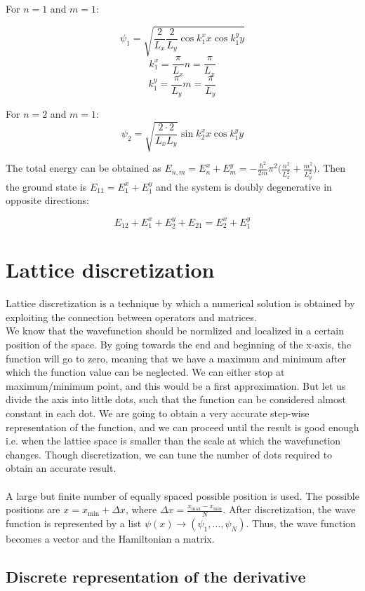   For $n=1$ and $m=1$:

  $$\psi_1 = \sqrt{\frac{2}{L_{x}}\frac{2}{L_{y}} \cos k_1^x x \cos k_1^y y}$$
  $$k_1^x = \frac{\pi}{L_{x}} n = \frac{\pi}{L_{x}}$$
  $$k_1^y = \frac{\pi}{L_{y}} m = \frac{\pi}{L_{y}}$$

  For $n=2$ and $m=1$:
  $$\psi_2 = \sqrt{\frac{2 \cdot 2}{L_{x}L_{y}}} \sin k_2^x x \cos k_1^y y$$

  The total energy can be obtained as $E_{n,m} = E_n^x+E_m^y = -\frac{\hbar^2}{2m}\pi^2\biggl(\frac{n^2}{L_x^2}+\frac{m^2}{L_y^2}\biggr)$.
  Then the ground state is $E_{11} = E_1^x+E_1^y$ and the system is doubly degenerative in opposite directions:

  $$E_{12} + E_1^x+E_2^y + E_{21} = E_2^x+E_1^y$$

\section{Lattice discretization}
Lattice discretization is a technique by which a numerical solution is obtained by exploiting the connection between operators and matrices.\\

\noindent
We know that the wavefunction should be normlized and localized in a certain position of the space.
By going towards the end and beginning of the x-axis, the function will go to zero, meaning that we have a maximum and minimum after which the function value can be neglected.
We can either stop at maximum/minimum point, and this would be a first approximation.
But let us divide the axis into little dots, such that the function can be considered almost constant in each dot.
We are going to obtain a very accurate step-wise representation of the function,  and we can proceed until the result is good enough i.e. when the lattice space is smaller than the scale at which the wavefunction changes.
Though discretization, we can tune the number of dots required to obtain an accurate result.\\
\\
\noindent
A large but finite number of equally spaced possible position is used.
The possible positions are $x = x_{\min} + \Delta x$, where $\Delta x = \frac{x_{\max}-x_{\min}}{N}$.
After discretization, the wave function is represented by a list $\psi(x) \rightarrow(\psi_1,\dots, \psi_N)$.
Thus, the wave function becomes a vector and the Hamiltonian a matrix.

  \subsection{Discrete representation of the derivative}

